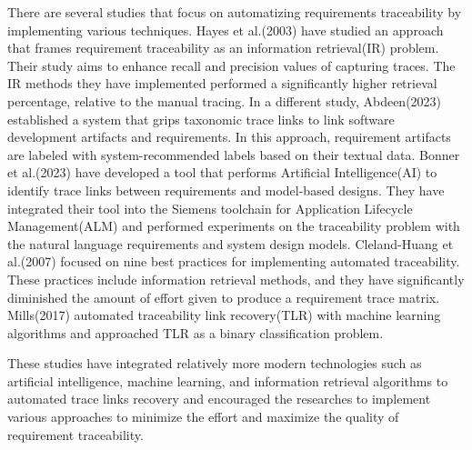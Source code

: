 \documentclass[conference]{IEEEtran}
\begin{document}
There are several studies that focus on automatizing requirements traceability by implementing various techniques. Hayes et al.(2003) have studied an approach that frames requirement traceability as an information retrieval(IR) problem. Their study aims to enhance recall and precision values of capturing traces. The IR methods they have implemented performed a significantly higher retrieval percentage, relative to the manual tracing. In a different study, Abdeen(2023) established a system that grips taxonomic trace links to link software development artifacts and requirements. In this approach, requirement artifacts are labeled with system-recommended labels based on their textual data. Bonner et al.(2023) have developed a tool that performs Artificial Intelligence(AI) to identify trace links between requirements and model-based designs. They have integrated their tool into the Siemens toolchain for Application Lifecycle Management(ALM) and performed experiments on the traceability problem with the natural language requirements and system design models. Cleland-Huang et al.(2007) focused on nine best practices for implementing automated traceability. These practices include information retrieval methods, and they have significantly diminished the amount of effort given to produce a requirement trace matrix. Mills(2017) automated traceability link recovery(TLR) with machine learning algorithms and approached TLR as a binary classification problem.

These studies have integrated relatively more modern technologies such as artificial intelligence, machine learning, and information retrieval algorithms to automated trace links recovery and encouraged the researches to implement various approaches to minimize the effort and maximize the quality of requirement traceability.


\end{document}
